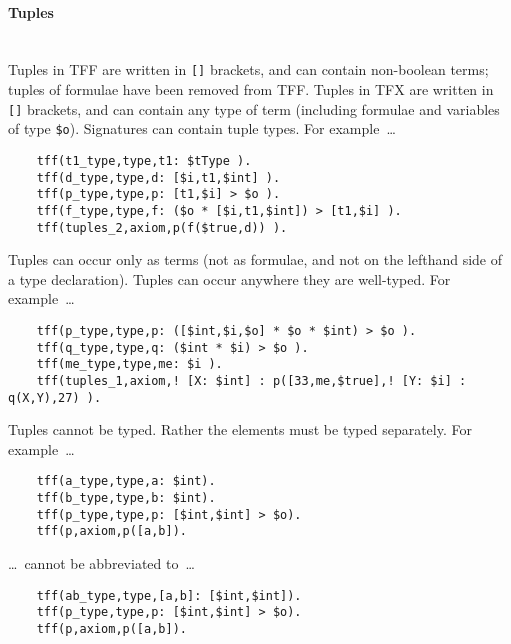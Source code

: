 \documentclass{easychair}
\begin{document}
\paragraph{Tuples}~\\
Tuples in TFF are written in {\tt []} brackets, and can contain non-boolean 
terms; tuples of formulae have been removed from TFF. 
Tuples in TFX are written in {\tt []} brackets, and can contain any type of 
term (including formulae and variables of type {\tt \$o}). 
Signatures can contain tuple types. 
For example~\ldots
\begin{verbatim}
    tff(t1_type,type,t1: $tType ).
    tff(d_type,type,d: [$i,t1,$int] ).
    tff(p_type,type,p: [t1,$i] > $o ).
    tff(f_type,type,f: ($o * [$i,t1,$int]) > [t1,$i] ).
    tff(tuples_2,axiom,p(f($true,d)) ).
\end{verbatim}
Tuples can occur only as terms (not as formulae, and not on the lefthand side 
of a type declaration). 
Tuples can occur anywhere they are well-typed. For example~\ldots
\begin{verbatim}
    tff(p_type,type,p: ([$int,$i,$o] * $o * $int) > $o ).
    tff(q_type,type,q: ($int * $i) > $o ).
    tff(me_type,type,me: $i ).
    tff(tuples_1,axiom,! [X: $int] : p([33,me,$true],! [Y: $i] : q(X,Y),27) ).
\end{verbatim}
Tuples cannot be typed. Rather the elements must be typed separately. 
For example~\ldots
\begin{verbatim}
    tff(a_type,type,a: $int).
    tff(b_type,type,b: $int).
    tff(p_type,type,p: [$int,$int] > $o).
    tff(p,axiom,p([a,b]).
\end{verbatim}
\ldots~cannot be abbreviated to~\ldots
\begin{verbatim}
    tff(ab_type,type,[a,b]: [$int,$int]).
    tff(p_type,type,p: [$int,$int] > $o).
    tff(p,axiom,p([a,b]).
\end{verbatim}
\end{document}
